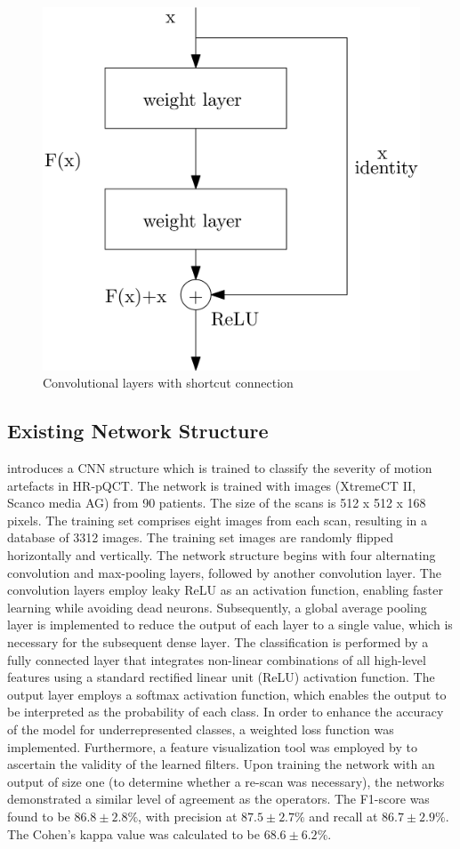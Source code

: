 \documentclass[
a4paper, 
12pt,
grayscalebody, %
abstract=on,
twoside, BCOR10mm, 12pt, DIV13,headinclude, footexclude, final, abstracton, openright
]{ibireprt}
\numberwithin{equation}{chapter}
\numberwithin{table}{chapter}
\numberwithin{figure}{chapter}
\numberwithin{algorithm}{chapter}
\numberwithin{example}{chapter}
\numberwithin{example}{chapter}
\begin{document}

\begin{figure}[h]	
	\center
	\includegraphics[width = 0.4 \textwidth]{conv_layer_with_skip_connection.png}%
	\caption{Convolutional layers with shortcut connection}
	\label{fig:ResNet_block}
\end{figure}%


\subsection{Existing Network Structure}
\citet{Walle2023} introduces a CNN structure which is trained to classify the severity of motion artefacts in HR-pQCT. The network is trained with images (XtremeCT II, Scanco media AG) from 90 patients. The size of the scans is 512 x 512 x 168 pixels. The training set comprises eight images from each scan, resulting in a database of 3312 images. The training set images are randomly flipped horizontally and vertically. The network structure begins with four alternating convolution and max-pooling layers, followed by another convolution layer. The convolution layers employ leaky ReLU as an activation function, enabling faster learning while avoiding dead neurons. Subsequently, a global average pooling layer is implemented to reduce the output of each layer to a single value, which is necessary for the subsequent dense layer. The classification is performed by a fully connected layer that integrates non-linear combinations of all high-level features using a standard rectified linear unit (ReLU) activation function. The output layer employs a softmax activation function, which enables the output to be interpreted as the probability of each class. In order to enhance the accuracy of the model for underrepresented classes, a weighted loss function was implemented. Furthermore, a feature visualization tool was employed by \citet{Walle2023} to ascertain the validity of the learned filters.
Upon training the network with an output of size one (to determine whether a re-scan was necessary), the networks demonstrated a similar level of agreement as the operators.  The F1-score was found to be $86.8 \pm 2.8\%$, with precision at $87.5 \pm 2.7\%$ and recall at $86.7 \pm 2.9\%$. The Cohen's kappa value was calculated to be $68.6 \pm 6.2\%$. 
\end{document}
